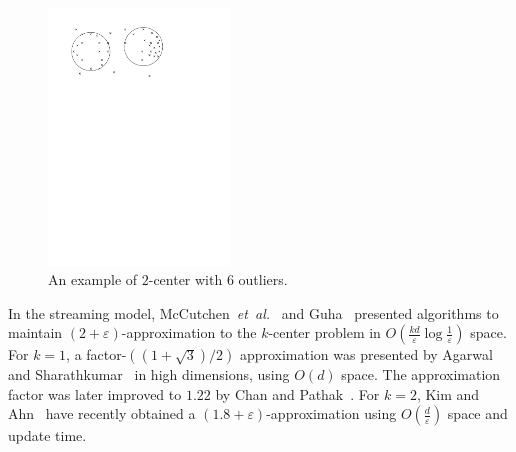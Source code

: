\documentclass[envcountsame]{cls/cccg15}
\renewcommand{\O}{\ensuremath{{O}}}
\newcommand{\eps}{\varepsilon}
\newcommand{\etal}{{\em et~al.\/}}
\begin{document}
\begin{figure}[t]
	\centering
	\includegraphics[width=13em]{figs/definition}
	\caption{An example of $2$-center with 6 outliers.}
	\label{fig:definition}
	\vspace{-.5em}
\end{figure}

In the streaming model, McCutchen~\etal~\cite{mccutchen2008streaming} 
and Guha~\cite{guha2009tight} presented algorithms to maintain $(2+\eps)$-approximation 
to the $k$-center problem in %
$\O(\frac{kd}{\eps} \log \frac{1}{\eps})$ space.
For $k=1$, %
a factor-$((1+\sqrt{3})/{2})$ approximation 
was presented by Agarwal and Sharathkumar~\cite{agarwal2010streaming} 
in high dimensions, using $O(d)$ space. 
The approximation factor was later improved 
to $1.22$ by Chan and Pathak~\cite{chan2014streaming}.
For $k=2$, Kim and Ahn~\cite{kim2014improved} 
have recently obtained a $(1.8+\eps)$-approximation  
using $\O(\frac{d}{\eps})$ space and update time.
\end{document}
